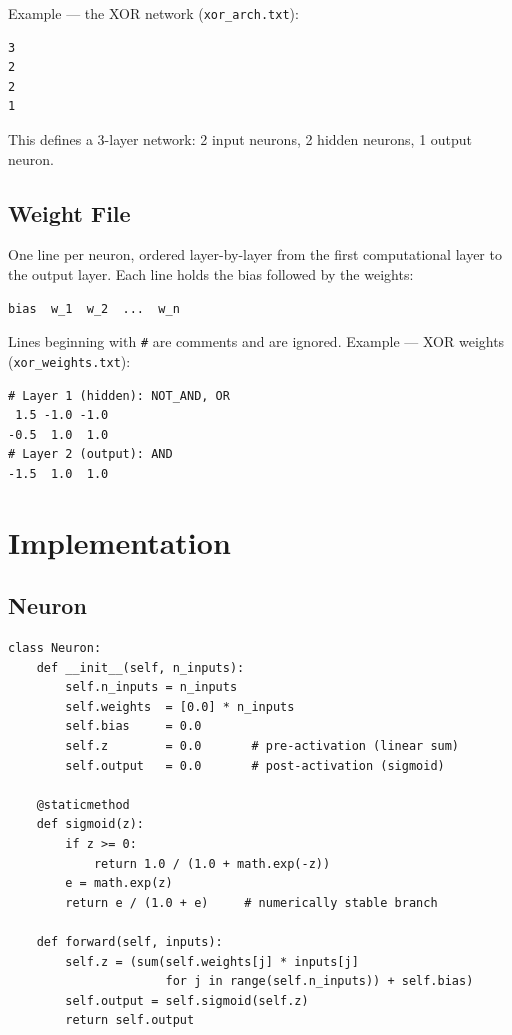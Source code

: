 \documentclass[12pt,a4paper]{article}
\begin{document}
Example --- the XOR network (\texttt{xor\_arch.txt}):
\begin{verbatim}
3
2
2
1
\end{verbatim}

This defines a 3-layer network: 2 input neurons, 2 hidden neurons, 1 output
neuron.

\subsection{Weight File}

One line per neuron, ordered layer-by-layer from the first computational layer
to the output layer.
Each line holds the bias followed by the weights:

\begin{verbatim}
bias  w_1  w_2  ...  w_n
\end{verbatim}

Lines beginning with \texttt{\#} are comments and are ignored.
Example --- XOR weights (\texttt{xor\_weights.txt}):
\begin{verbatim}
# Layer 1 (hidden): NOT_AND, OR
 1.5 -1.0 -1.0
-0.5  1.0  1.0
# Layer 2 (output): AND
-1.5  1.0  1.0
\end{verbatim}

\section{Implementation}

\subsection{Neuron}

\begin{lstlisting}[caption={Neuron class}]
class Neuron:
    def __init__(self, n_inputs):
        self.n_inputs = n_inputs
        self.weights  = [0.0] * n_inputs
        self.bias     = 0.0
        self.z        = 0.0       # pre-activation (linear sum)
        self.output   = 0.0       # post-activation (sigmoid)

    @staticmethod
    def sigmoid(z):
        if z >= 0:
            return 1.0 / (1.0 + math.exp(-z))
        e = math.exp(z)
        return e / (1.0 + e)     # numerically stable branch

    def forward(self, inputs):
        self.z = (sum(self.weights[j] * inputs[j]
                      for j in range(self.n_inputs)) + self.bias)
        self.output = self.sigmoid(self.z)
        return self.output
\end{lstlisting}
\end{document}
